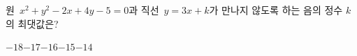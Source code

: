 원~$x^2+y^2-2x+4y-5=0$과 직선~$y=3x+k$가 만나지 않도록 하는 음의 정수 $k$의 최댓값은?
\begin{choices32}{$-18$}{$-17$}{$-16$}{$-15$}{$-14$}\end{choices32}
